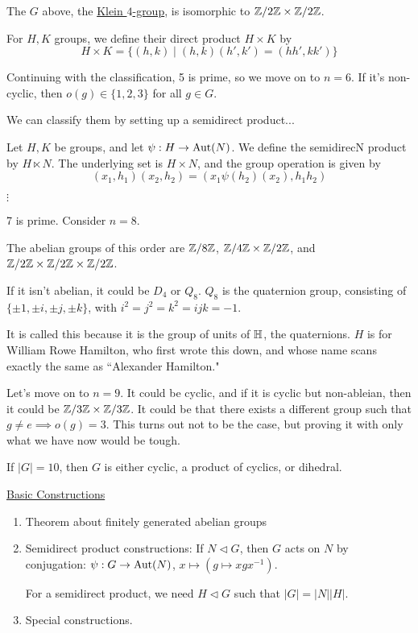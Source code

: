 \documentclass[x11names,reqno,14pt]{extarticle}
\begin{document}
\claim The $G$ above, the \underline{Klein $4$-group}, is isomorphic to $\mathbb{Z}/2\mathbb{Z} \times \mathbb{Z}/2\mathbb{Z}$. 


For $H, K$ groups, we define their direct product $H\times K$ by 
\[
H\times K = \{(h, k) \mid (h,k)(h',k') = (hh', kk')\}
\] 

Continuing with the classification, 5 is prime, so we move on to $n = 6$. If it's non-cyclic, then $o(g) \in \{1, 2, 3\}$ for all $g \in G$. 

We can classify them by setting up a semidirect product...

Let $H, K$ be groups, and let $\psi:H\to{\mathrm{Aut}}(N)$. We define the semidirecN product by $H\ltimes N$. The underlying set is $H\times N$, and the group operation is given by 
\[
(x_1,h_1)(x_2,h_2) = (x_1\psi(h_2)(x_2),h_1h_2)
\]




$\vdots$ 

7 is prime. Consider $n = 8$. 

The abelian groups of this order are $\mathbb{Z}/8\mathbb{Z}$, $\mathbb{Z}/4\mathbb{Z}\times\mathbb{Z}/2\mathbb{Z}$, and $\mathbb{Z}/2\mathbb{Z}\times\mathbb{Z}/2\mathbb{Z}\times\mathbb{Z}/2\mathbb{Z}$.  

If it isn't abelian, it could be $D_4$ or $Q_8$. $Q_8$ is the quaternion group, consisting of $\{\pm 1, \pm i, \pm j, \pm k\}$, with $i^2 = j^2 = k^2 = ijk = -1$. 

It is called this because it is the group of units of ${\mathbb{H}}$, the quaternions. $H$ is for William Rowe Hamilton, who first wrote this down, and whose name scans exactly the same as ``Alexander Hamilton." 

Let's move on to $n = 9$. It could be cyclic, and if it is cyclic but non-ableian, then it could be $\mathbb{Z}/3\mathbb{Z}\times\mathbb{Z}/3\mathbb{Z}$. It could be that there exists a different group such that $g\neq e \implies o(g) = 3$. This turns out not to be the case, but proving it with only what we have now would be tough. 

If $|G| = 10$, then $G$ is either cyclic, a product of cyclics, or dihedral. 

\underline{Basic Constructions}
\begin{enumerate}
\item Theorem about finitely generated abelian groups
\item Semidirect product constructions: If $N\lhd G$, then $G$ acts on $N$ by conjugation: $\psi:G\to{\mathrm{Aut}}(N)$, $x\mapsto(g\mapsto xgx^{-1})$. 

For a semidirect product, we need $H \lhd G$ such that $|G| = |N||H|$. 
\item Special constructions.  
\end{enumerate}
\end{document}
